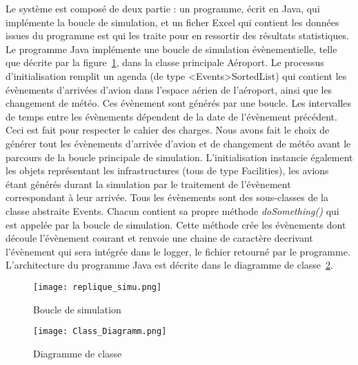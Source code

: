 


Le système est composé de deux partie : un programme, écrit en Java,  qui implémente la boucle de simulation, et un ficher Excel qui contient les données issues du programme est qui les traite pour en ressortir des résultats statistiques.
\\
Le programme Java implémente une boucle de simulation évènementielle, telle que décrite par la figure~\ref{replique}, dans la classe principale Aéroport. 
Le processus d'initialisation remplit un agenda (de type <Events>SortedList) qui contient les évènements d'arrivées d'avion dans l'espace aérien de l'aéroport, ainsi que les changement de météo. Ces évènement sont générés par une boucle. 
Les intervalles de temps entre les évènements dépendent de la date de l'évènement précédent. Ceci est fait pour respecter le cahier des charges. 
Nous avons fait le choix de générer tout les évènements d'arrivée d'avion et de changement de météo avant le parcours de la boucle principale de simulation. L'initialisation instancie également les objets représentant les infrastructures (tous de type Facilities), les avions étant générés durant la simulation par le traitement de l'évènement correspondant à leur arrivée.
Tous les évènements sont des sous-classes de la classe abstraite Events. Chacun contient sa propre méthode \textit{doSomething()} qui est appelée par la boucle de simulation. Cette méthode crée les évènements dont découle l'évènement courant et renvoie une chaine de caractère decrivant l'évènement qui sera intégrée dans le logger, le fichier retourné par le programme.
L'architecture du programme Java est décrite dans le diagramme de classe~\ref{class_diagramm}.
 \begin{figure}[h]
 \centering
 \texttt{[image: replique\_simu.png]}
   \caption{\label{replique} Boucle de simulation}
 \end{figure}
\clearpage

\begin{figure}[h!]
\hspace{-2cm}
 \texttt{[image: Class\_Diagramm.png]}
  \caption{\label{class_diagramm} Diagramme de classe} 
 \end{figure}
 
